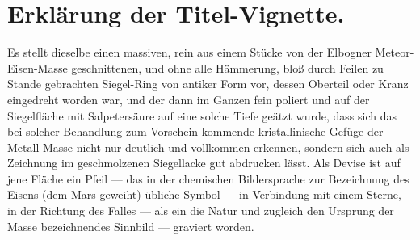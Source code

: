 \documentclass[a4paper, 11pt, oneside, german]{article}
\begin{document}
\section{Erklärung der Titel-Vignette.}

Es stellt dieselbe einen massiven, rein aus einem Stücke von der Elbogner Meteor-Eisen-Masse geschnittenen, und ohne alle Hämmerung, bloß durch Feilen zu Stande gebrachten Siegel-Ring von antiker Form vor, dessen Oberteil oder Kranz eingedreht worden war, und der dann im Ganzen fein poliert und auf der Siegelfläche mit Salpetersäure auf eine solche Tiefe geätzt wurde, dass sich das bei solcher Behandlung zum Vorschein kommende kristallinische Gefüge der Metall-Masse nicht nur deutlich und vollkommen erkennen, sondern sich auch als Zeichnung im geschmolzenen Siegellacke gut abdrucken lässt. Als Devise ist auf jene Fläche ein Pfeil --- das in der chemischen Bildersprache zur Bezeichnung des Eisens (dem Mars geweiht) übliche Symbol --- in Verbindung mit einem Sterne, in der Richtung des Falles --- als ein die Natur und zugleich den Ursprung der Masse bezeichnendes Sinnbild --- graviert worden.
\end{document}

